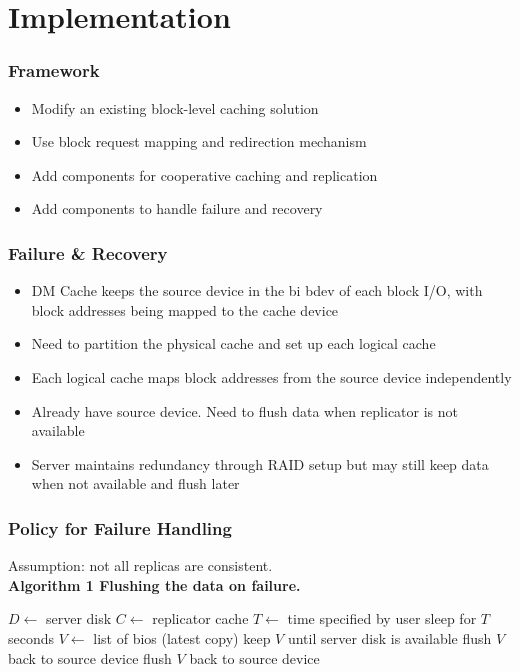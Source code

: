 \section{Implementation}
%
\begin{frame}
    \frametitle{Framework}
    \begin{itemize}
	\item Modify an existing block-level caching solution
	\item Use block request mapping and redirection mechanism
	\item Add components for cooperative caching and replication
	\item Add components to handle failure and recovery
    \end{itemize}
\end{frame}
\begin{frame}
    \frametitle{Failure \& Recovery}
    \begin{itemize}
	\item DM Cache keeps the source device in the bi bdev
	    of each block I/O, with block addresses being mapped
	    to the cache device
	\item Need to partition the physical cache and set up
	    each logical cache
	\item Each logical cache maps block addresses from the
	    source device independently
	\item Already have source device. Need to flush data when
	    replicator is not available
	\item Server maintains redundancy through RAID setup but
	    may still keep data when not available and flush later
    \end{itemize}
\end{frame}
\begin{frame}
    \frametitle{Policy for Failure Handling}
    Assumption: not all replicas are consistent. \\
    \bf Algorithm 1 \rm Flushing the data on failure. \\
    \begin{algorithmic}[1]
	    \State $D\gets$ server disk
	    \State $C\gets$ replicator cache
	    \State $T\gets$ time specified by user
		    sleep for $T$ seconds
		    \Else {}
			\State $V\gets$ list of bios (latest copy)
			    \State keep $V$ until server disk is available
			    \State flush $V$ back to source device
			\Else {}
			    \State flush $V$ back to source device
		    \EndIf
		\EndIf
	    \EndWhile
	\EndProcedure
    \end{algorithmic}   
\end{frame}
